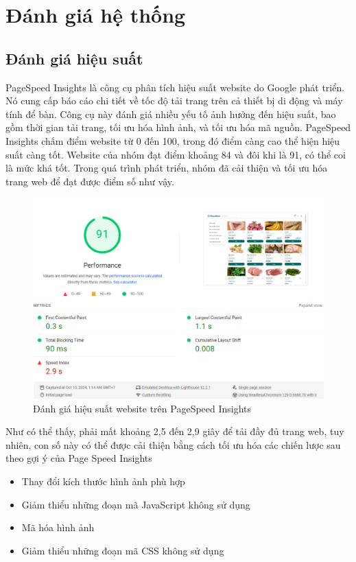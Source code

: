 \section{Đánh giá hệ thống}
\subsection{Đánh giá hiệu suất}
PageSpeed Insights là công cụ phân tích hiệu suất website do Google phát triển. 
Nó cung cấp báo cáo chi tiết về tốc độ tải trang trên cả thiết bị di động và máy tính để bàn. 
Công cụ này đánh giá nhiều yếu tố ảnh hưởng đến hiệu suất, bao gồm thời gian tải trang, tối ưu hóa hình ảnh, và tối ưu hóa mã nguồn. 
PageSpeed Insights chấm điểm website từ 0 đến 100, trong đó điểm càng cao thể hiện hiệu suất càng tốt. 
Website của nhóm đạt điểm khoảng 84 và đôi khi là 91, có thể coi là mức khá tốt. Trong quá trình phát triển, nhóm đã cải thiện và tối ưu hóa trang web để đạt được điểm số như vậy.
\begin{figure}[H]
    \centering
    \includegraphics[width=\linewidth] {Images/performance.png}
    \vspace{1em}
    \caption{Đánh giá hiệu suất website trên PageSpeed Insights}
\end{figure}

Như có thể thấy, phải mất khoảng 2,5 đến 2,9 giây để tải đầy đủ trang web, tuy nhiên, con số này có thể được cải thiện bằng cách tối ưu hóa các chiến lược sau theo gợi ý của Page Speed Insights
\begin{itemize}
    \item Thay đổi kích thước hình ảnh phù hợp
    \item Giảm thiểu những đoạn mã JavaScript không sử dụng
    \item Mã hóa hình ảnh
    \item Giảm thiểu những đoạn mã CSS không sử dụng
\end{itemize}